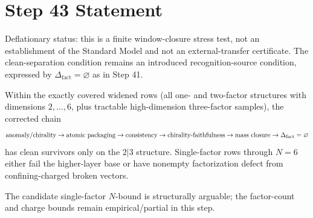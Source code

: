 \documentclass[11pt]{article}
\begin{document}
\section*{Step 43 Statement}
Deflationary status: this is a finite window-closure stress test, not an establishment of the Standard Model and not an external-transfer certificate. The clean-separation condition remains an introduced recognition-source condition, expressed by $\Delta_{\mathrm{fact}}= \varnothing$ as in Step 41.

Within the exactly covered widened rows (all one- and two-factor structures with dimensions $2,\ldots,6$, plus tractable high-dimension three-factor samples), the corrected chain
\[
\hbox{anomaly/chirality}\to \hbox{atomic packaging}\to \hbox{consistency}\to
\hbox{chirality-faithfulness}\to \hbox{mass closure}\to \Delta_{\mathrm{fact}}=\varnothing
\]
has clean survivors only on the \(2|3\) structure. Single-factor rows through \(N=6\) either fail the higher-layer base or have nonempty factorization defect from confining-charged broken vectors.

The candidate single-factor \(N\)-bound is structurally arguable; the factor-count and charge bounds remain empirical/partial in this step.
\end{document}
